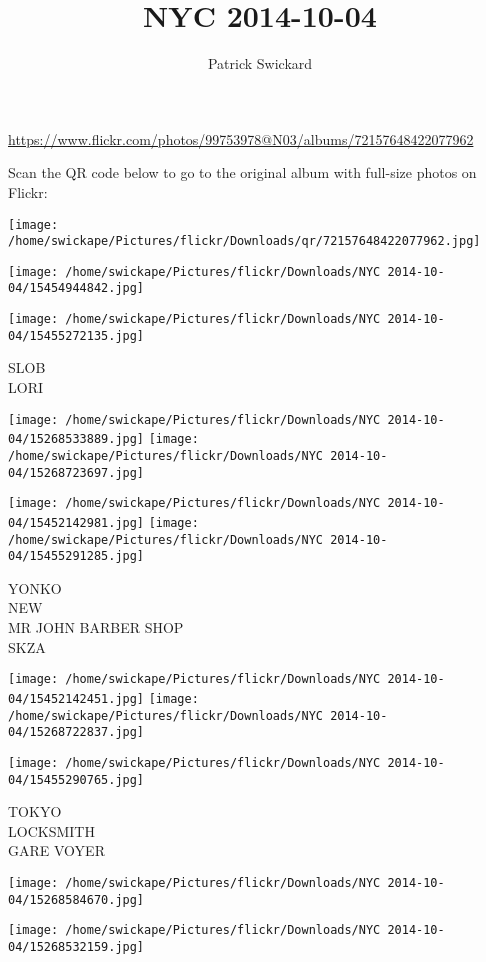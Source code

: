 \documentclass[10pt,letterpaper]{article}
\title{NYC 2014-10-04}
\author{Patrick Swickard}
\date{}
\begin{document}
\maketitle

\url{https://www.flickr.com/photos/99753978@N03/albums/72157648422077962}

Scan the QR code below to go to the original album with full-size photos on Flickr:

\texttt{[image: /home/swickape/Pictures/flickr/Downloads/qr/72157648422077962.jpg]}
\pagebreak

\texttt{[image: /home/swickape/Pictures/flickr/Downloads/NYC 2014-10-04/15454944842.jpg]}

\vspace{0.25in}
\texttt{[image: /home/swickape/Pictures/flickr/Downloads/NYC 2014-10-04/15455272135.jpg]}

SLOB\\
LORI
\pagebreak

\texttt{[image: /home/swickape/Pictures/flickr/Downloads/NYC 2014-10-04/15268533889.jpg]}
\texttt{[image: /home/swickape/Pictures/flickr/Downloads/NYC 2014-10-04/15268723697.jpg]}

\texttt{[image: /home/swickape/Pictures/flickr/Downloads/NYC 2014-10-04/15452142981.jpg]}
\texttt{[image: /home/swickape/Pictures/flickr/Downloads/NYC 2014-10-04/15455291285.jpg]}

YONKO\\
NEW\\
MR JOHN BARBER SHOP\\
SKZA
\pagebreak

\texttt{[image: /home/swickape/Pictures/flickr/Downloads/NYC 2014-10-04/15452142451.jpg]}
\texttt{[image: /home/swickape/Pictures/flickr/Downloads/NYC 2014-10-04/15268722837.jpg]}

\texttt{[image: /home/swickape/Pictures/flickr/Downloads/NYC 2014-10-04/15455290765.jpg]}

TOKYO\\
LOCKSMITH\\
GARE VOYER
\pagebreak

\texttt{[image: /home/swickape/Pictures/flickr/Downloads/NYC 2014-10-04/15268584670.jpg]}

\vspace{0.25in}
\texttt{[image: /home/swickape/Pictures/flickr/Downloads/NYC 2014-10-04/15268532159.jpg]}
\end{document}
